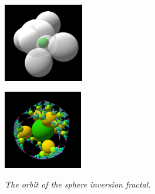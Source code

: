 \begin{figure}[htbp]
 \begin{minipage}[t]{0.5\hsize}
  \center
  \includegraphics[height=1.35in, keepaspectratio]{img/preparation/3dExtension/3dKissingGenerator.png}
  \label{fig:simpleGen}
  \hspace*{\fill}
 \end{minipage}
 \begin{minipage}[t]{0.5\hsize}
  \center
  \includegraphics[height=1.35in, keepaspectratio]{img/preparation/3dExtension/3dOrbit.png}
  \label{fig:simpleOrb}
  \hspace*{\fill}
 \end{minipage}
 \caption{\textit{The orbit of the sphere inversion fractal.}}
 \label{fig:simpleGenOrb}
\end{figure}

